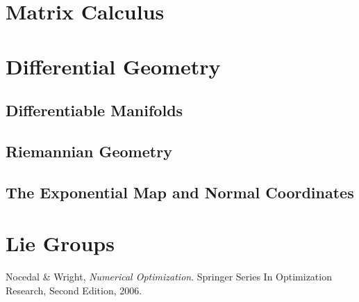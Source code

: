 \documentclass{amsart}
\begin{document}
\section{Matrix Calculus}

\section{Differential Geometry}
\subsection{Differentiable Manifolds}
\subsection{Riemannian Geometry}
\subsection{The Exponential Map and Normal Coordinates}

\section{Lie Groups}

\begin{thebibliography}{999}

Nocedal \& Wright,
\emph{Numerical Optimization}.
Springer Series In Optimization Research,
Second Edition,
2006.

\end{thebibliography}
\end{document}
